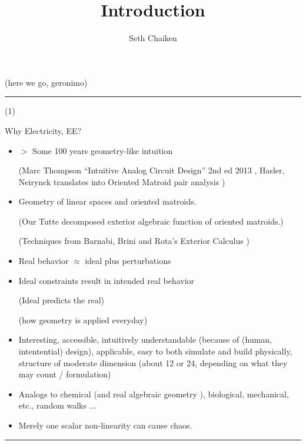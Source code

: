 \documentclass{article}
\title{Introduction}
\author{Seth Chaiken}
\begin{document}
\maketitle

(here we go, geronimo)


\rule{\textwidth}{3pt}
(1)








Why Electricity, EE?
\begin{itemize}
\item $>$ Some 100 years geometry-like intuition

(Marc Thompson ``Intuitive Analog Circuit Design'' 2nd ed 2013
\cite{intuitAna}, Hasler, Neirynck translates into
Oriented Matroid pair analysis \cite{HaslerNeirynck})


\item Geometry of linear spaces and oriented matroids.

(Our Tutte decomposed exterior algebraic
function of oriented matroids.)

(Techniques from Barnabi, Brini and Rota's Exterior Calculus 
\cite{exteriorCalc})

\item
Real behavior $\approx$ ideal plus perturbations

\item
Ideal constraints result in intended real behavior

(Ideal predicts the real)

(how geometry is applied everyday)

\item 
Interesting, accessible, intuitively understandable
(because of (human, intentential) design), applicable,
easy to both simulate and build physically, structure of moderate
dimension (about 12 or 24, depending on what they may count / formulation)
\item
Analogs to chemical (and real algebraic geometry 
\cite{signsInChemRAG}), biological, mechanical, etc., random walks ...



\item
Merely one scalar non-linearity can cause chaos.
\end{itemize}
\rule{\textwidth}{3pt}
\end{document}

